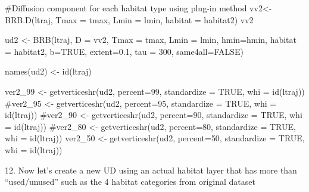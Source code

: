 \documentclass[
  letterpaper,
]{book}
\newenvironment{Shaded}{\begin{snugshade}}{\end{snugshade}}
\newcommand{\AttributeTok}[1]{\textcolor[rgb]{0.40,0.45,0.13}{#1}}
\newcommand{\CommentTok}[1]{\textcolor[rgb]{0.37,0.37,0.37}{#1}}
\newcommand{\ConstantTok}[1]{\textcolor[rgb]{0.56,0.35,0.01}{#1}}
\newcommand{\DecValTok}[1]{\textcolor[rgb]{0.68,0.00,0.00}{#1}}
\newcommand{\FloatTok}[1]{\textcolor[rgb]{0.68,0.00,0.00}{#1}}
\newcommand{\FunctionTok}[1]{\textcolor[rgb]{0.28,0.35,0.67}{#1}}
\newcommand{\NormalTok}[1]{\textcolor[rgb]{0.00,0.23,0.31}{#1}}
\newcommand{\OtherTok}[1]{\textcolor[rgb]{0.00,0.23,0.31}{#1}}
\begin{document}
\begin{Shaded}
\begin{Highlighting}[]
\CommentTok{\#Diffusion component for each habitat type using plug{-}in method}
\NormalTok{vv2}\OtherTok{\textless{}{-}} \FunctionTok{BRB.D}\NormalTok{(ltraj, }\AttributeTok{Tmax =}\NormalTok{ tmax, }\AttributeTok{Lmin =}\NormalTok{ lmin,  }\AttributeTok{habitat =}\NormalTok{ habitat2)}
\NormalTok{vv2}

\NormalTok{ud2 }\OtherTok{\textless{}{-}} \FunctionTok{BRB}\NormalTok{(ltraj, }\AttributeTok{D =}\NormalTok{ vv2, }\AttributeTok{Tmax =}\NormalTok{ tmax, }\AttributeTok{Lmin =}\NormalTok{ lmin, }\AttributeTok{hmin=}\NormalTok{hmin, }\AttributeTok{habitat =}\NormalTok{ habitat2, }\AttributeTok{b=}\ConstantTok{TRUE}\NormalTok{, }
  \AttributeTok{extent=}\FloatTok{0.1}\NormalTok{, }\AttributeTok{tau =} \DecValTok{300}\NormalTok{, }\AttributeTok{same4all=}\ConstantTok{FALSE}\NormalTok{)}

\FunctionTok{names}\NormalTok{(ud2) }\OtherTok{\textless{}{-}} \FunctionTok{id}\NormalTok{(ltraj) }

\NormalTok{ver2\_99 }\OtherTok{\textless{}{-}} \FunctionTok{getverticeshr}\NormalTok{(ud2, }\AttributeTok{percent=}\DecValTok{99}\NormalTok{, }\AttributeTok{standardize =} \ConstantTok{TRUE}\NormalTok{, }\AttributeTok{whi =} \FunctionTok{id}\NormalTok{(ltraj))}
\CommentTok{\#ver2\_95 \textless{}{-} getverticeshr(ud2, percent=95, standardize = TRUE, whi = id(ltraj))}
\CommentTok{\#ver2\_90 \textless{}{-} getverticeshr(ud2, percent=90, standardize = TRUE, whi = id(ltraj))}
\CommentTok{\#ver2\_80 \textless{}{-} getverticeshr(ud2, percent=80, standardize = TRUE, whi = id(ltraj))}
\NormalTok{ver2\_50 }\OtherTok{\textless{}{-}} \FunctionTok{getverticeshr}\NormalTok{(ud2, }\AttributeTok{percent=}\DecValTok{50}\NormalTok{, }\AttributeTok{standardize =} \ConstantTok{TRUE}\NormalTok{, }\AttributeTok{whi =} \FunctionTok{id}\NormalTok{(ltraj))}
\end{Highlighting}
\end{Shaded}

12. Now let's create a new UD using an actual habitat layer that has
more than ``used/unused'' such as the 4 habitat categories from original
dataset
\end{document}
